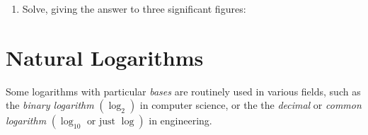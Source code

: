 \documentclass[
  11pt,
  openany]{book}
\begin{document}
\begin{enumerate}
\begin{enumerate}
    \end{enumerate}
    \item Solve, giving the answer to three significant figures: \faCalculator
    \begin{enumerate}
    \end{enumerate}
\end{enumerate}

\pagebreak

\section{Natural Logarithms}\label{natural-logarithms}

\vspace{-0.5cm}

Some logarithms with particular \emph{bases} are routinely used in various fields, such as the \emph{binary logarithm} \(\left(\log_2\right)\) in computer science, or the the \emph{decimal} or \emph{common logarithm} \(\left(\log_{10}\text{ or just }\log\right)\) in engineering.
\end{document}
